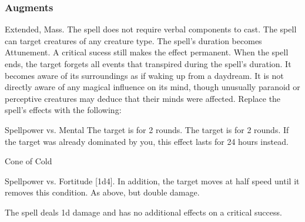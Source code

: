 \subsubsection{Augments}
 Extended, Mass.
The spell does not require verbal components to cast.
The spell can target creatures of any creature type.
The spell's duration becomes Attunement.
A critical sucess still makes the effect permanent.
When the spell ends, the target forgets all events that transpired during the spell's duration.
It becomes aware of its surroundings as if waking up from a daydream.
It is not directly aware of any magical influence on its mind, though unusually paranoid or perceptive creatures may deduce that their minds were affected.
Replace
the spell's effects with the following:
\begin{augmenteffects}
\begin{spellattack}{Spellpower vs. Mental}
\spellsuccess The target is \confused for 2 rounds.
\spellcritical
The target is \dominated for 2 rounds.
If the target was already dominated by you, this effect lasts for 24 hours instead.
\end{spellattack}
\end{augmenteffects}
\begin{spellsection}{Cone of Cold}
\begin{spellheader}
\end{spellheader}
\begin{spellcontent}
\begin{spelltargetinginfo}
\end{spelltargetinginfo}
\begin{spelleffects}
\begin{spellattack}{Spellpower vs. Fortitude}
\spellsuccess
{}[1d4].
In addition, the target moves at half speed until it removes this condition.
\spellcritical As above, but double damage.
\end{spellattack}
\end{spelleffects}
\end{spellcontent}
\begin{spellfooter}
\miscastexplode
\end{spellfooter}
\begin{spellcantrip}
The spell deals \minus1d damage and has no additional effects on a critical success.
\end{spellcantrip}
\end{spellsection}
